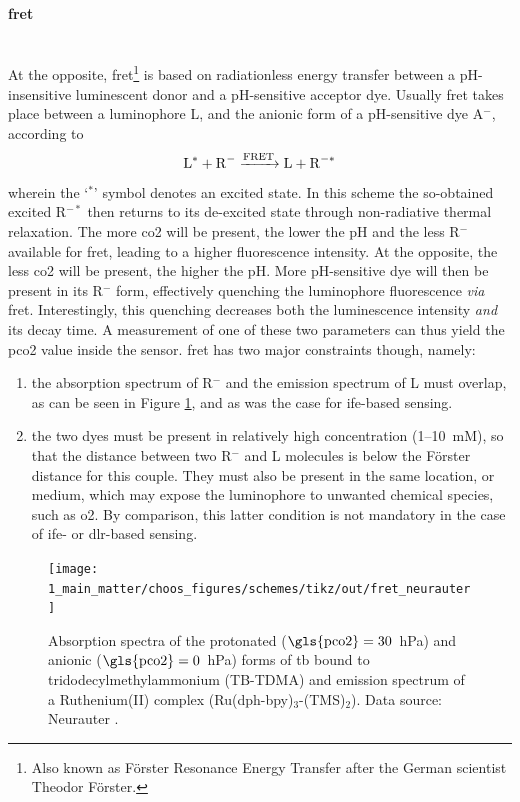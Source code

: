 \paragraph{\texorpdfstring{\gls{fret}}{FRET}}\mbox{}\\

At the opposite, \gls{fret}\footnote{Also known as Förster Resonance Energy Transfer after the German scientist Theodor Förster\cite{forster1948}.} is based on radiationless energy transfer between a pH-insensitive luminescent donor and a pH-sensitive acceptor dye. Usually \gls{fret} takes place between a luminophore L, and the anionic form of a pH-sensitive dye A$^-$, according to
\begin{equation}
	\ce{L^* + R^- ->[FRET] L + R^{-*}}
\end{equation}
wherein the `$^*$' symbol denotes an excited state. In this scheme the so-obtained excited R$^{-*}$ then returns to its de-excited state through non-radiative thermal relaxation. The more \gls{co2} will be present, the lower the pH and the less R$^-$ available for \gls{fret}, leading to a higher fluorescence intensity. At the opposite, the less \gls{co2} will be present, the higher the pH. More pH-sensitive dye will then be present in its R$^-$ form, effectively quenching the luminophore fluorescence \textit{via} \gls{fret}. Interestingly, this quenching decreases both the luminescence intensity \emph{and} its decay time. A measurement of one of these two parameters can thus yield the \gls{pco2} value inside the sensor. \gls{fret} has two major constraints though, namely:
\begin{enumerate}
	\item the absorption spectrum of R$^-$ and the emission spectrum of L must overlap, as can be seen in Figure \ref{fig:choos:dye_based:advanced:fret_ex}, and as was the case for \gls{ife}-based sensing.
	\item the two dyes must be present in relatively high concentration (1--10~mM), so that the distance between two R$^-$ and L molecules is below the Förster distance for this couple. They must also be present in the same location, or medium, which may expose the luminophore to unwanted chemical species, such as \gls{o2}. By comparison, this latter condition is not mandatory in the case of \gls{ife}- or \gls{dlr}-based sensing.
\end{enumerate}

\begin{figure}
	\centering
	\texttt{[image: 1\_main\_matter/choos\_figures/schemes/tikz/out/fret\_neurauter]}
	\caption[\gls{fret} scheme example.]{Absorption spectra of the protonated ($\text{\gls{pco2}}=30$~hPa) and anionic ($\text{\gls{pco2}}=0$~hPa) forms of \gls{tb} bound to tridodecylmethylammonium (TB-TDMA) and emission spectrum of a Ruthenium(II) complex (Ru(dph-bpy)$_3$-(TMS)$_2$). Data source: Neurauter \etal{}\cite{neurauter1999}.}
	\label{fig:choos:dye_based:advanced:fret_ex}
\end{figure}

